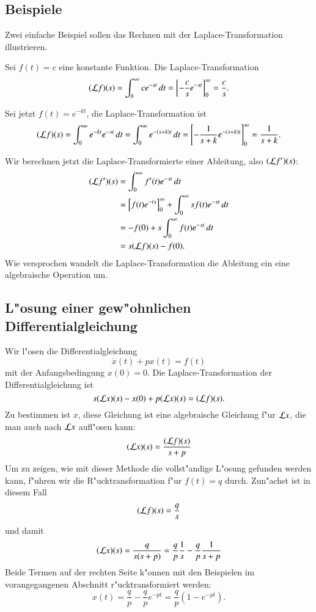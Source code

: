 \subsection{Beispiele}
Zwei einfache Beispiel sollen das Rechnen mit der Laplace-Transformation
illustrieren.

Sei $f(t)=c$ eine konstante Funktion. Die Laplace-Transformation
\[
({\cal L}f)(s)
=
\int_0^\infty ce^{-st}\,dt
=
\left[
-\frac{c}{s}e^{-st}
\right]_0^\infty=\frac{c}{s}.
\]

Sei jetzt $f(t)=e^{-kt}$, die Laplace-Transformation ist
\[
({\cal L}f)(s)=\int_0^\infty e^{-kt}e^{-st}\,dt
=\int_0^{\infty}e^{-(s+k)t}\,dt
=
\left[
- \frac1{s+k}e^{-(s+k)t}
\right]_0^\infty
=\frac1{s+k}.
\]

Wir berechnen jetzt die Laplace-Transformierte einer Ableitung, also
$({\cal L}f')(s)$:
\begin{align*}
({\cal L}f')(s)
&=
\int_0^\infty f'(t)e^{-st}\,dt
\\
&=
\left[f(t)e^{-ts}\right]_0^\infty
+
\int_0^\infty sf(t)e^{-st}\,dt
\\
&=
-f(0)+s\int_0^\infty f(t)e^{-st}\,dt
\\
&=s({\cal L}f)(s)-f(0).
\end{align*}
Wie versprochen wandelt die Laplace-Transformation die Ableitung
ein eine algebraische Operation um.

\subsection{L"osung einer gew"ohnlichen Differentialgleichung}
Wir l"osen die Differentialgleichung
\[
\dot x(t)+px(t)=f(t)
\]
mit der Anfangsbedingung $x(0)=0$.
Die Laplace-Transformation der Differentialgleichung ist
\[
s({\cal L}x)(s)-x(0)+p({\cal L}x)(s)=({\cal L}f)(s).
\]
Zu bestimmen ist $x$, diese Gleichung ist eine algebraische Gleichung
f"ur ${\cal L}x$, die man auch nach ${\cal L}x$ aufl"osen kann:
\[
({\cal L}x)(s)
=
\frac{({\cal L}f)(s)}{s+p}
\]
Um zu zeigen, wie mit dieser Methode die vollst"andige L"osung gefunden
werden kann, f"uhren wir die R"ucktransformation f"ur $f(t)=q$ durch.
Zun"achst ist in diesem Fall
\[
({\cal L}f)(s)=\frac{q}{s}
\]
und damit 
\[
({\cal L}x)(s)
=
\frac{q}{s(s+p)}=\frac{q}{p}\frac{1}{s}-\frac{q}{p}\frac{1}{s+p}
\]
Beide Termen auf der rechten Seite k"onnen mit den Beispielen im vorangegangenen
Abschnitt r"ucktransformiert werden:
\[
x(t)=\frac{q}{p}-\frac{q}{p}e^{-pt}=\frac{q}{p}(1-e^{-pt}).
\]

